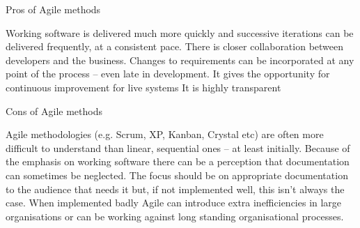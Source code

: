 Pros of Agile methods

Working software is delivered much more quickly and successive iterations can be delivered frequently, at a consistent pace.
There is closer collaboration between developers and the business.
Changes to requirements can be incorporated at any point of the process – even late in development.
It gives the opportunity for continuous improvement for live systems
It is highly transparent

Cons of Agile methods

Agile methodologies (e.g. Scrum, XP, Kanban, Crystal etc) are often more difficult to understand than linear, sequential ones – at least initially.
Because of the emphasis on working software there can be a perception that documentation can sometimes be neglected. The focus should be on appropriate documentation to the audience that needs it but, if not implemented well, this isn’t always the case.
When implemented badly Agile can introduce extra inefficiencies in large organisations or can be working against long standing organisational processes.

